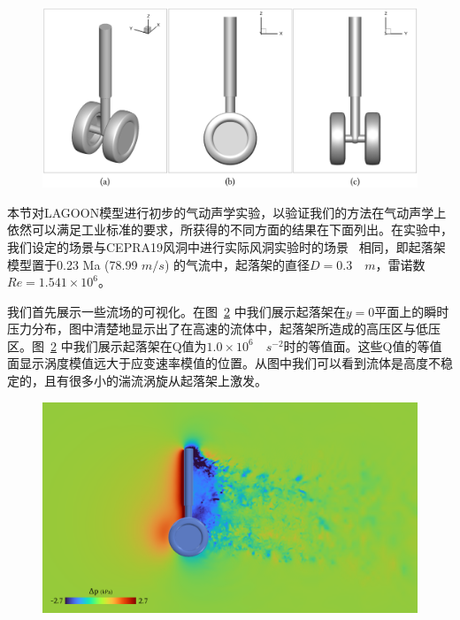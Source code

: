 \begin{figure}[!htbp]
  \centering
    \includegraphics[width=0.9\columnwidth]{figures/landing_gear_model.png}
  \label{img:landing_gear_model}
\end{figure}

本节对LAGOON模型进行初步的气动声学实验，以验证我们的方法在气动声学上依然可以满足工业标准的要求，所获得的不同方面的结果在下面列出。在实验中，我们设定的场景与CEPRA19风洞中进行实际风洞实验时的场景~\citep{doi:10.2514/6.2015-2993} 相同，即起落架模型置于0.23 Ma (78.99 $m/s$) 的气流中，起落架的直径$D=0.3 \quad m$，雷诺数$Re=1.541\times 10^6$。

我们首先展示一些流场的可视化。在图~\ref{img:landing_gear_pressure} 中我们展示起落架在$y=0$平面上的瞬时压力分布，图中清楚地显示出了在高速的流体中，起落架所造成的高压区与低压区。图~\ref{img:landing_gear_pressure} 中我们展示起落架在Q值为$1.0\times 10^6 \quad s^{-2}$时的等值面。这些Q值的等值面显示涡度模值远大于应变速率模值的位置。从图中我们可以看到流体是高度不稳定的，且有很多小的湍流涡旋从起落架上激发。

\begin{figure}[!htbp]
  \centering
    \includegraphics[width=0.99\columnwidth]{figures/landing_gear_pressure.png}
  \label{img:landing_gear_pressure}
\end{figure}

